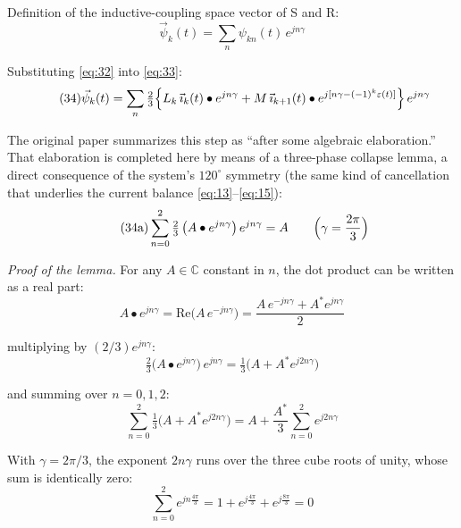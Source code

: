 \documentclass[11pt,a4paper]{article}
\begin{document}
Definition of the inductive-coupling space vector of S and R:
\begin{equation}\tag{33}\label{eq:33}
\vec\psi_k(t) = \sum_n \psi_{kn}(t)\,e^{jn\gamma}
\end{equation}

Substituting \eqref{eq:32} into \eqref{eq:33}:
\begin{equation}\tag{34}\label{eq:34}
\vec\psi_k(t) = \sum_n \tfrac23\Bigl\{L_k\,\vec\imath_k(t)\bullet e^{jn\gamma} + M\,\vec\imath_{k+1}(t)\bullet e^{j[n\gamma-(-1)^k\varepsilon(t)]}\Bigr\}\,e^{jn\gamma}
\end{equation}

The original paper summarizes this step as ``after some algebraic elaboration.'' That elaboration is completed here by means of a three-phase collapse lemma, a direct consequence of the system's $120^\circ$ symmetry (the same kind of cancellation that underlies the current balance \eqref{eq:13}--\eqref{eq:15}):
\begin{equation}\tag{34a}\label{eq:34a}
\sum_{n=0}^{2}\tfrac23\,\bigl(A\bullet e^{jn\gamma}\bigr)\,e^{jn\gamma} = A\qquad\Bigl(\gamma=\frac{2\pi}{3}\Bigr)
\end{equation}

\emph{Proof of the lemma.} For any $A\in\mathbb{C}$ constant in $n$, the dot product can be written as a real part:
\begin{equation}\tag{34b}\label{eq:34b}
A\bullet e^{jn\gamma} = \mathrm{Re}\bigl(A\,e^{-jn\gamma}\bigr) = \frac{A\,e^{-jn\gamma} + A^{*}e^{jn\gamma}}{2}
\end{equation}

multiplying by $(2/3)e^{jn\gamma}$:
\begin{equation}\tag{34c}\label{eq:34c}
\tfrac23\bigl(A\bullet e^{jn\gamma}\bigr)\,e^{jn\gamma} = \tfrac13\bigl(A + A^{*}e^{j2n\gamma}\bigr)
\end{equation}

and summing over $n=0,1,2$:
\begin{equation}\tag{34d}\label{eq:34d}
\sum_{n=0}^{2}\tfrac13\bigl(A + A^{*}e^{j2n\gamma}\bigr) = A + \frac{A^{*}}{3}\sum_{n=0}^{2} e^{j2n\gamma}
\end{equation}

With $\gamma=2\pi/3$, the exponent $2n\gamma$ runs over the three cube roots of unity, whose sum is identically zero:
\begin{equation}\tag{34e}\label{eq:34e}
\sum_{n=0}^{2} e^{jn\frac{4\pi}{3}} = 1 + e^{j\frac{4\pi}{3}} + e^{j\frac{8\pi}{3}} = 0
\end{equation}
\end{document}
